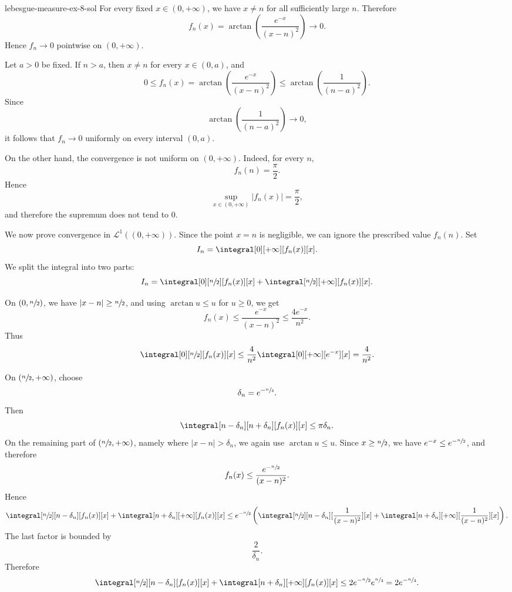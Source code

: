 \documentclass[preview]{standalone}
\begin{document}
\begin{snippetsolution}{lebesgue-measure-ex-8-sol}{}
    For every fixed \(x\in(0,+\infty)\), we have \(x\neq n\) for all
    sufficiently large \(n\). Therefore
    \[
        f_n(x)
        =
        \arctan\left(
            \frac{e^{-x}}{(x-n)^2}
        \right)
        \to 0.
    \]
    Hence \(f_n\to 0\) pointwise on \((0,+\infty)\).

    Let \(a>0\) be fixed. If \(n>a\), then \(x\neq n\) for every
    \(x\in(0,a)\), and
    \[
        0\leq f_n(x)
        =
        \arctan\left(
            \frac{e^{-x}}{(x-n)^2}
        \right)
        \leq
        \arctan\left(
            \frac{1}{(n-a)^2}
        \right).
    \]
    Since
    \[
        \arctan\left(
            \frac{1}{(n-a)^2}
        \right)
        \to 0,
    \]
    it follows that \(f_n\to 0\) uniformly on every interval \((0,a)\).

    On the other hand, the convergence is not uniform on \((0,+\infty)\). Indeed,
    for every \(n\),
    \[
        f_n(n)=\frac\pi2.
    \]
    Hence
    \[
        \sup_{x\in(0,+\infty)} |f_n(x)|
        =
        \frac\pi2,
    \]
    and therefore the supremum does not tend to \(0\).

    We now prove convergence in \(\mathcal L^1((0,+\infty))\). Since the
    point \(x=n\) is negligible, we can ignore the prescribed value \(f_n(n)\).
    Set
    \[
        I_n=\integral[0][+\infty][f_n(x)][x].
    \]
    We split the integral into two parts:
    \[
        I_n
        =
        \integral[0][\sfrac n2][f_n(x)][x]
        +
        \integral[\sfrac n2][+\infty][f_n(x)][x].
    \]

    On \((0,\sfrac n2)\), we have \(|x-n|\geq \sfrac n2\), and using
    \(\arctan u\leq u\) for \(u\geq 0\), we get
    \[
        f_n(x)
        \leq
        \frac{e^{-x}}{(x-n)^2}
        \leq
        \frac{4e^{-x}}{n^2}.
    \]
    Thus
    \[
        \integral[0][\sfrac n2][f_n(x)][x]
        \leq
        \frac4{n^2}\integral[0][+\infty][e^{-x}][x]
        =
        \frac4{n^2}.
    \]

    On \((\sfrac n2,+\infty)\), choose
    \[
        \delta_n=e^{-\sfrac n4}.
    \]
    Then
    \[
        \integral[n-\delta_n][n+\delta_n][f_n(x)][x]
        \leq
        \pi\delta_n.
    \]
    On the remaining part of \((\sfrac n2,+\infty)\), namely where
    \(|x-n|>\delta_n\), we again use \(\arctan u\leq u\). Since
    \(x\geq \sfrac n2\), we have \(e^{-x}\leq e^{-\sfrac n2}\), and therefore
    \[
        f_n(x)
        \leq
        \frac{e^{-\sfrac n2}}{(x-n)^2}.
    \]
    Hence
    \[
        \integral[\sfrac n2][n-\delta_n][f_n(x)][x]
        +
        \integral[n+\delta_n][+\infty][f_n(x)][x]
        \leq
        e^{-\sfrac n2}
        \left(
            \integral[\sfrac n2][n-\delta_n][\frac1{(x-n)^2}][x]
            +
            \integral[n+\delta_n][+\infty][\frac1{(x-n)^2}][x]
        \right).
    \]
    The last factor is bounded by
    \[
        \frac{2}{\delta_n}.
    \]
    Therefore
    \[
        \integral[\sfrac n2][n-\delta_n][f_n(x)][x]
        +
        \integral[n+\delta_n][+\infty][f_n(x)][x]
        \leq
        2e^{-\sfrac n2}e^{\sfrac n4}
        =
        2e^{-\sfrac n4}.
    \]


\end{snippetsolution}
\end{document}

